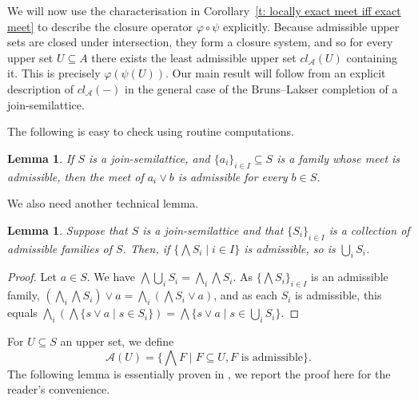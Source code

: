 \documentclass[11pt,a4paper,reqno]{amsart}
\newcommand{\tbigwedge}{\mathop{\textstyle \bigwedge }}%
\newtheorem{lemma}[theorem]{Lemma}
\theoremstyle{definition}
\theoremstyle{remark}
\newcommand{\ca}[1]{\mathcal{#1}}
\newcommand{\mi}{\mathit}
\newcommand{\se}{\subseteq}
\newcommand{\ve}{\vee}
\begin{document}
{We will now use the characterisation in Corollary~\ref{t: locally exact meet iff exact meet} to describe the closure operator $\varphi\circ \psi$ explicitly. Because admissible upper sets are closed under intersection, they form a closure system, and so for every upper set $U\subseteq A$ there exists the least admissible upper set $\mi{cl}_\ca{A}(U)$ containing it. This is precisely $\varphi(\psi(U))$. Our main result will follow from an explicit description of $\mi{cl}_\ca{A}(-)$ in the general case of the Bruns--Lakser completion of a join-semilattice.

The following is easy to check using routine computations.
\begin{lemma}\label{l: exactness stable under binary joins}
    If $S$ is a join-semilattice, and $\{a_i\}_{i\in I}\subseteq S$ is a family whose meet is admissible, then the meet of $a_i\vee b$ is admissible for every $b\in S$.
\end{lemma}
We also need another technical lemma.
\begin{lemma}\label{l: union of exact families is exact}
    Suppose that $S$ is a join-semilattice and that $\{S_i\}_{i\in I}$ is a collection of admissible families of $S$. Then, if $\{\tbigwedge S_i\mid i\in I\}$ is admissible, so is $\bigcup_i S_i$.
\end{lemma}
\begin{proof}
    Let $a\in S$. We have $\tbigwedge \bigcup_i S_i=\tbigwedge_i \tbigwedge S_i$. As $\{\tbigwedge S_i\}_{i\in I}$ is an admissible family, $(\tbigwedge_i \tbigwedge S_i )\ve a=\tbigwedge_i (\tbigwedge S_i \vee a)$, and as each $S_i$ is admissible, this equals $\tbigwedge_i (\tbigwedge \{s\vee a\mid s\in S_i\})=\tbigwedge \{s\ve a\mid s\in \bigcup_i S_i\}$.
\end{proof}
For $U\se S$ an upper set, we define
\[
\ca{A}(U)=\{\tbigwedge F\mid F\se U,F\text{ is admissible}\}.
\]
The following lemma is essentially proven in \cite[Lemma~3]{BrunsLakser1970}, we report the proof here for the reader's convenience. 

}
\end{document}

